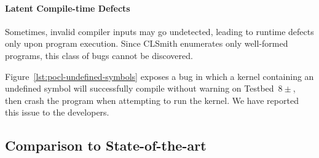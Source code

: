 \paragraph{Latent Compile-time Defects} Sometimes, invalid compiler inputs may go undetected, leading to runtime defects only upon program execution. Since CLSmith enumerates only well-formed programs, this class of bugs cannot be discovered.

Figure~\ref{lst:pocl-undefined-symbols} exposes a bug in which a kernel containing an undefined symbol will successfully compile without warning on Testbed~$8\pm$, then crash the program when attempting to run the kernel. We have reported this issue to the developers.

%
%
%
%
%


\subsection{Comparison to State-of-the-art}%
\label{subsec:vs_clsmith}

